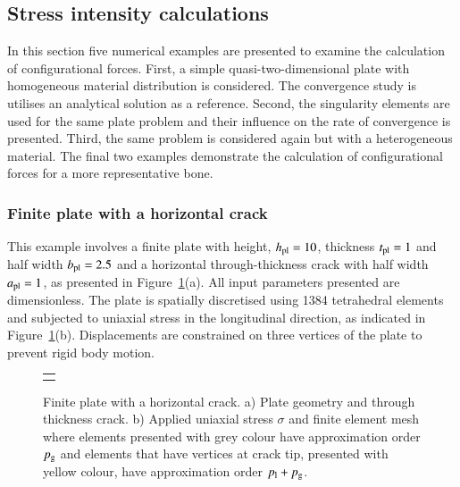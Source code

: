 \documentclass[review]{elsarticle}
\numberwithin{equation}{section}
\begin{document}
\subsection{Stress intensity calculations}
\label{sec:release_energy_rate}
In this section five numerical examples are presented to examine the calculation of configurational forces.
First, a simple quasi-two-dimensional plate with homogeneous material distribution is considered.  The convergence study is utilises an analytical solution as a reference.
Second, the singularity elements are used for the same plate problem and their influence on the rate of convergence is presented. 
Third, the same problem is considered again but with a heterogeneous material. 
The final two examples demonstrate the calculation of configurational forces for a more representative bone.
 
\subsubsection{Finite plate with a horizontal crack}\label{sec:plate_section}
This example involves a finite plate with height, $h_{\rm {pl}} = 10$, thickness $t_{\rm {pl}}=1$ and half width $b_{\rm{pl}} = 2.5$ and a horizontal through-thickness crack with half width $a_{\rm {pl}} = 1$, as presented in Figure~\ref{fig:plate_load_mesh}(a). All input parameters presented are dimensionless. 
The  plate is spatially discretised using 1384 tetrahedral elements and subjected to uniaxial stress in the longitudinal direction, as indicated in Figure~\ref{fig:plate_load_mesh}(b). 
Displacements are constrained on three vertices of the plate to prevent rigid body motion. 

\begin{figure}[h!]
\begin{center}
\begin{tabular}{c}
{\def\svgwidth{17cm} }\\
\end{tabular}
\caption{Finite plate with a horizontal crack. a) Plate geometry and through thickness crack. b) Applied uniaxial stress $\sigma$ and finite element mesh where elements presented with grey colour have approximation order $p_{\rm g}$ and elements that have vertices at crack tip, presented with yellow colour, have approximation order $p_{\rm l}+p_{\rm g}$. }
\label{fig:plate_load_mesh}
\end{center}
\end{figure}
\end{document}
